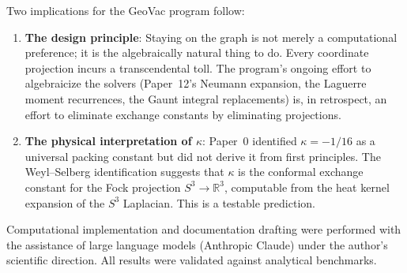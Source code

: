 \documentclass[aps,pra,twocolumn,superscriptaddress,longbibliography]{revtex4-2}
\begin{document}
Two implications for the GeoVac program follow:
\begin{enumerate}
  \item \textbf{The design principle}: Staying on the graph
    is not merely a computational preference; it is the
    algebraically natural thing to do.  Every coordinate
    projection incurs a transcendental toll.  The program's
    ongoing effort to algebraicize the solvers
    (Paper~12's Neumann expansion, the Laguerre moment
    recurrences, the Gaunt integral replacements) is, in
    retrospect, an effort to eliminate exchange constants by
    eliminating projections.
  \item \textbf{The physical interpretation of $\kappa$}:
    Paper~0 identified $\kappa = -1/16$ as a universal packing
    constant but did not derive it from first principles.  The
    Weyl--Selberg identification suggests that $\kappa$ is the
    conformal exchange constant for the Fock projection
    $S^3 \to \mathbb{R}^3$, computable from the heat kernel
    expansion of the $S^3$ Laplacian.  This is a testable
    prediction.
\end{enumerate}

\begin{acknowledgments}
Computational implementation and documentation drafting were
performed with the assistance of large language models (Anthropic
Claude) under the author's scientific direction.  All results
were validated against analytical benchmarks.
\end{acknowledgments}


\end{document}
